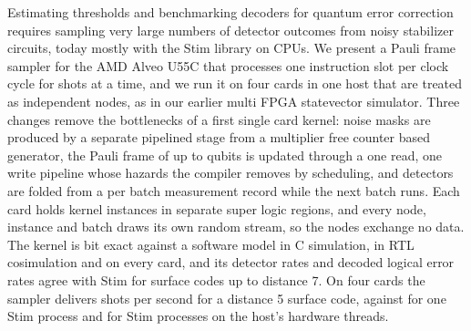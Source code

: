 Estimating thresholds and benchmarking decoders for quantum error correction requires sampling very large numbers of
detector outcomes from noisy stabilizer circuits, today mostly with the Stim library on CPUs. We
present a Pauli frame sampler for the AMD Alveo U55C that processes one instruction slot per clock cycle for
\NumLanes{} shots at a time, and we run it on four cards in one host that are treated as independent nodes, as in our
earlier multi FPGA statevector simulator. Three changes remove the bottlenecks of a first single card kernel:
noise masks are produced by a separate pipelined stage from a multiplier free counter based generator, the Pauli frame of up
to \NumQubitsMax{} qubits is updated through a one read, one write pipeline whose hazards the compiler removes by
scheduling, and detectors are folded from a per batch measurement record while the next batch runs. Each card holds \NumInstancesPerCard{} kernel instances in separate super logic regions, and every node, instance
and batch draws its own random stream, so the nodes exchange no data. The kernel is bit exact against a software model in
C simulation, in RTL cosimulation and on every card, and its detector rates and decoded logical error rates agree with
Stim for surface codes up to distance 7. On four cards the sampler delivers \NumFpgaFourSurfFive{} shots per second
for a distance 5 surface code, against \NumCpuOneSurfFive{} for one Stim process and
\NumCpuAllSurfFive{} for \NumCpuMaxProcs{} Stim processes on the host's \NumHostThreads{} hardware threads.
